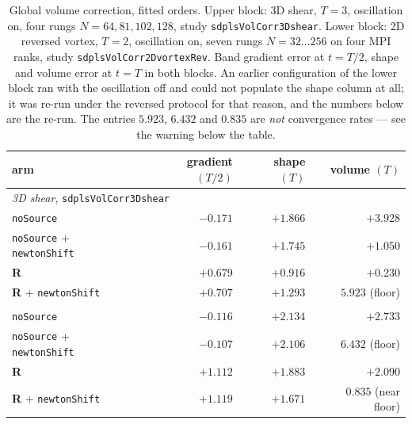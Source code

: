 \documentclass[preprint,3p,11pt]{elsarticle}
\begin{document}
\begin{table}[htbp]
\centering
\caption{Global volume correction, fitted orders. Upper block: 3D shear,
$T=3$, oscillation on, four rungs $N = 64, 81, 102, 128$, study
\texttt{sdplsVolCorr3Dshear}. Lower block: 2D reversed vortex, $T=2$, oscillation
on, seven rungs $N=32\ldots256$ on four MPI ranks, study
\texttt{sdplsVolCorr2DvortexRev}. Band gradient error at $t=T/2$, shape and volume
error at $t=T$ in both blocks. An earlier configuration of the lower block ran
with the oscillation off and could not populate the shape column at all; it was
re-run under the reversed protocol for that reason, and the numbers below are the
re-run. The entries $5.923$, $6.432$ and $0.835$ are \emph{not} convergence
rates --- see the warning below the table.}
\label{tab:volcorr}
\small
\begin{tabular}{lrrr}
\toprule
arm & gradient $(T/2)$ & shape $(T)$ & volume $(T)$ \\
\midrule
\multicolumn{4}{l}{\emph{3D shear}, \texttt{sdplsVolCorr3Dshear}}\\
\texttt{noSource}                     & $-0.171$ & $+1.866$ & $+3.928$ \\
\texttt{noSource} + \texttt{newtonShift} & $-0.161$ & $+1.745$ & $+1.050$ \\
\textbf{R}                            & $+0.679$ & $+0.916$ & $+0.230$ \\
\textbf{R} + \texttt{newtonShift}     & $+0.707$ & $+1.293$ & $5.923$ (floor) \\
\addlinespace
\multicolumn{4}{l}{\emph{2D reversed vortex}, \texttt{sdplsVolCorr2DvortexRev}}\\
\texttt{noSource}                     & $-0.116$ & $+2.134$ & $+2.733$ \\
\texttt{noSource} + \texttt{newtonShift} & $-0.107$ & $+2.106$ & $6.432$ (floor) \\
\textbf{R}                            & $+1.112$ & $+1.883$ & $+2.090$ \\
\textbf{R} + \texttt{newtonShift}     & $+1.119$ & $+1.671$ & $0.835$ (near floor) \\
\bottomrule
\end{tabular}
\end{table}
\end{document}
